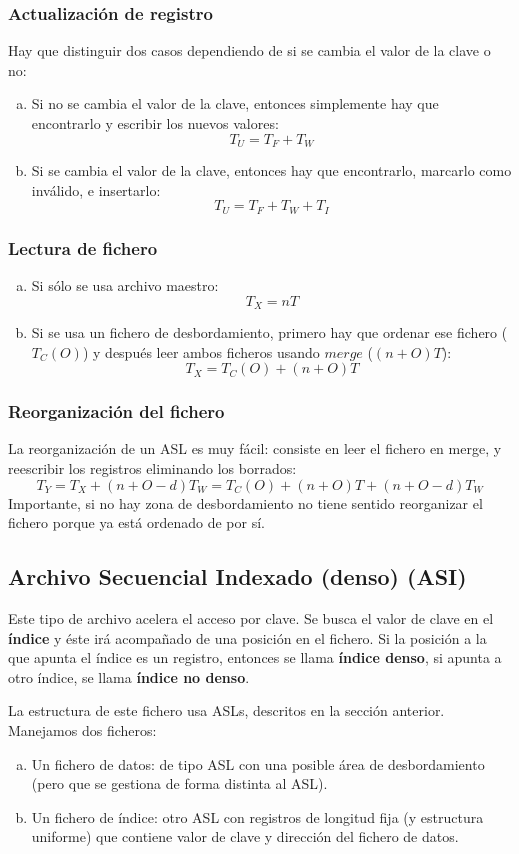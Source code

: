 \subsubsection{Actualización de registro}
Hay que distinguir dos casos dependiendo de si se cambia el valor de la clave o no:
\begin{enumerate}[(a)]
\item Si no se cambia el valor de la clave, entonces simplemente hay que encontrarlo y escribir los nuevos valores:
\[
T_U=T_F+T_W
\]
\item Si se cambia el valor de la clave, entonces hay que encontrarlo, marcarlo como inválido, e insertarlo:
\[
T_U=T_F+T_W+T_I
\]
\end{enumerate}
\subsubsection{Lectura de fichero}
\begin{enumerate}[(a)]
\item Si sólo se usa archivo maestro:
\[
T_X=nT
\]
\item Si se usa un fichero de desbordamiento, primero hay que ordenar ese fichero ($T_C(O)$) y después leer ambos ficheros usando $merge$ ($(n+O)T$):
\[
T_X=T_C(O)+(n+O)T
\]
\end{enumerate}
\subsubsection{Reorganización del fichero}
La reorganización de un ASL es muy fácil: consiste en leer el fichero en merge, y reescribir los registros eliminando los borrados:
\[
T_Y=T_X+(n+O-d)T_W=T_C(O)+(n+O)T+(n+O-d)T_W
\]
Importante, si no hay zona de desbordamiento no tiene sentido reorganizar el fichero porque ya está ordenado de por sí.
\subsection{Archivo Secuencial Indexado (denso) (ASI)}

Este tipo de archivo acelera el acceso por clave. Se busca el valor de clave en el \textbf{índice} y éste irá acompañado de una posición en el fichero. Si la posición a la que apunta el índice es un registro, entonces se llama \textbf{índice denso}, si apunta a otro índice, se llama \textbf{índice no denso}.

La estructura de este fichero usa ASLs, descritos en la sección anterior. Manejamos dos ficheros:
\begin{enumerate}[(a)]
\item Un fichero de datos: de tipo ASL con una posible área de desbordamiento (pero que se gestiona de forma distinta al ASL).
\item Un fichero de índice: otro ASL con registros de longitud fija (y estructura uniforme) que contiene valor de clave y dirección del fichero de datos.
\end{enumerate}

